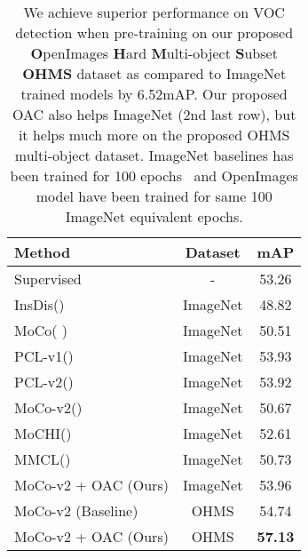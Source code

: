 \begin{table*}
    \centering
    \begin{tabu} to \linewidth {lcc} 
        \toprule
        Method & Dataset  & mAP \\ 
     \hline
     Supervised  & - & 53.26 \\ 
     \hline
     InsDis(\cite{wu2018unsupervised}) &  ImageNet & 48.82 \\ 
     MoCo( \cite{he2020momentum} ) &  ImageNet & 50.51 \\ 
     PCL-v1(\cite{li2021prototypical}) &  ImageNet & 53.93 \\ 
     PCL-v2(\cite{li2021prototypical}) &  ImageNet & 53.92 \\ 
     MoCo-v2(\cite{chen2020exploring}) & ImageNet & 50.67 \\ 
     MoCHI(\cite{kalantidis2020hard}) & ImageNet & 52.61 \\ 
     MMCL(\cite{shah2021max}) & ImageNet & 50.73 \\
     MoCo-v2 + OAC (Ours) & ImageNet &  {53.96} \\
     
     \hline
    MoCo-v2 (Baseline) & {OHMS} &  {54.74} \\
     MoCo-v2 + OAC (Ours) & OHMS &  \textbf{57.13} \\ 
        
        \bottomrule
    \end{tabu}
    \vspace{0.1in}
    \caption{We achieve superior performance on VOC detection when pre-training on our proposed \textbf{O}penImages \textbf{H}ard \textbf{M}ulti-object \textbf{S}ubset \textbf{OHMS} dataset  as compared to ImageNet trained models by 6.52mAP. Our proposed OAC also helps ImageNet (2nd last row), but it helps much more on the proposed OHMS multi-object dataset. ImageNet baselines has been trained for 100 epochs~\cite{shah2021max} and OpenImages model have been trained for same 100 ImageNet equivalent epochs.}
    \label{tab:ssl_comparison_teaser_detection}
\end{table*}

